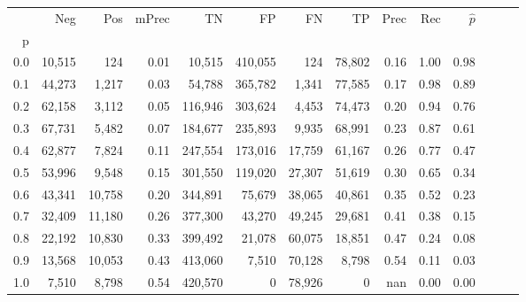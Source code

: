 \begin{tabular}{rrrrrrrrrrrrrr}
\toprule
{} &     Neg &     Pos & mPrec &       TN &       FP &      FN &      TP &  Prec &   Rec & $\hat{p}$ \\
p   &         &         &       &          &          &         &         &       &       &           \\
\midrule
0.0 &  10,515 &     124 &  0.01 &   10,515 &  410,055 &     124 &  78,802 &  0.16 &  1.00 &      0.98 \\
0.1 &  44,273 &   1,217 &  0.03 &   54,788 &  365,782 &   1,341 &  77,585 &  0.17 &  0.98 &      0.89 \\
0.2 &  62,158 &   3,112 &  0.05 &  116,946 &  303,624 &   4,453 &  74,473 &  0.20 &  0.94 &      0.76 \\
0.3 &  67,731 &   5,482 &  0.07 &  184,677 &  235,893 &   9,935 &  68,991 &  0.23 &  0.87 &      0.61 \\
0.4 &  62,877 &   7,824 &  0.11 &  247,554 &  173,016 &  17,759 &  61,167 &  0.26 &  0.77 &      0.47 \\
0.5 &  53,996 &   9,548 &  0.15 &  301,550 &  119,020 &  27,307 &  51,619 &  0.30 &  0.65 &      0.34 \\
0.6 &  43,341 &  10,758 &  0.20 &  344,891 &   75,679 &  38,065 &  40,861 &  0.35 &  0.52 &      0.23 \\
0.7 &  32,409 &  11,180 &  0.26 &  377,300 &   43,270 &  49,245 &  29,681 &  0.41 &  0.38 &      0.15 \\
0.8 &  22,192 &  10,830 &  0.33 &  399,492 &   21,078 &  60,075 &  18,851 &  0.47 &  0.24 &      0.08 \\
0.9 &  13,568 &  10,053 &  0.43 &  413,060 &    7,510 &  70,128 &   8,798 &  0.54 &  0.11 &      0.03 \\
1.0 &   7,510 &   8,798 &  0.54 &  420,570 &        0 &  78,926 &       0 &   nan &  0.00 &      0.00 \\
\bottomrule
\end{tabular}
